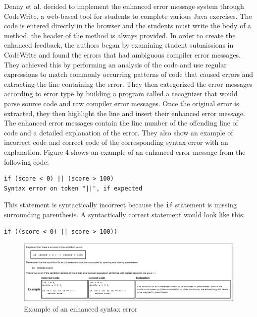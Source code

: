 \documentclass{sig-alternate}
\begin{document}
Denny et al. decided to implement the enhanced error message system through CodeWrite, a web-based tool for students to complete various Java exercises.
The code is entered directly in the browser and the students must write the body of a method, the header of the method is always provided.
In order to create the enhanced feedback, the authors began by examining student submissions in CodeWrite and found the errors that had ambiguous compiler error messages. 
They achieved this by performing an analysis of the code and use regular expressions to match commonly occurring patterns of code that caused errors and  extracting the line containing the error.
They then categorized the error messages according to error type by building a program called a recognizer that would parse source code and raw compiler error messages.
Once the original error is extracted, they then highlight the line and insert their enhanced error message.
The enhanced error messages contain the line number of the offending line of code and a detailed explanation of the error.
They also show an example of incorrect code and correct code of the corresponding syntax error with an explanation.
Figure 4 shows an example of an enhanced error message from the following code:~\cite{Denny:2014:ESE:2591708.2591748}

\begin{verbatim}
if (score < 0) || (score > 100)
Syntax error on token "||", if expected
\end{verbatim}

This statement is syntactically incorrect because the \texttt{if} statement is missing surrounding parenthesis. A syntactically correct statement would look like this:

\begin{verbatim}
if ((score < 0) || score > 100))
\end{verbatim}

\begin{figure}
  \centering
  \includegraphics[keepaspectratio, width=\textwidth]{ESE_example.png}
  \caption{Example of an enhanced syntax error}
  \label{fig:drracketstudy}
\end{figure}
\end{document}
